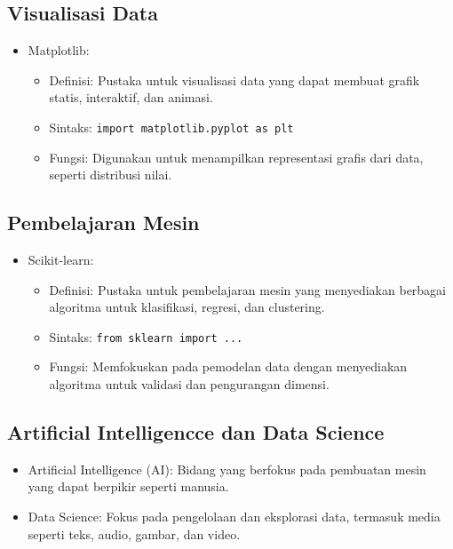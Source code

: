 \documentclass{article}
\begin{document}
\subsection{Visualisasi Data}
\begin{itemize}
    \item Matplotlib:
          \begin{itemize}
              \item Definisi: Pustaka untuk visualisasi data yang dapat membuat grafik statis, interaktif, dan animasi.
              \item Sintaks: \verb|import matplotlib.pyplot as plt|
              \item Fungsi: Digunakan untuk menampilkan representasi grafis dari data, seperti distribusi nilai.
          \end{itemize}
\end{itemize}

\subsection{Pembelajaran Mesin}
\begin{itemize}
    \item Scikit-learn:
          \begin{itemize}
              \item Definisi: Pustaka untuk pembelajaran mesin yang menyediakan berbagai algoritma untuk klasifikasi, regresi, dan clustering.
              \item Sintaks: \verb|from sklearn import ...|
              \item Fungsi: Memfokuskan pada pemodelan data dengan menyediakan algoritma untuk validasi dan pengurangan dimensi.
          \end{itemize}
\end{itemize}

\subsection{Artificial Intelligencce dan Data Science}
\begin{itemize}
    \item Artificial Intelligence (AI): Bidang yang berfokus pada pembuatan mesin yang dapat berpikir seperti manusia.
    \item Data Science: Fokus pada pengelolaan dan eksplorasi data, termasuk media seperti teks, audio, gambar, dan video.
\end{itemize}
\end{document}
